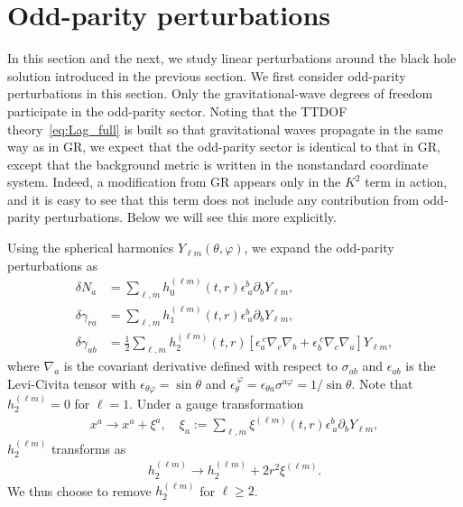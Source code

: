 \documentclass[aps,prd,preprintnumbers,superscriptaddress,nofootinbib,notitlepage]{revtex4-2}
\begin{document}
\section{Odd-parity perturbations}\label{odd-parity}


In this section and the next, we study linear perturbations around the black hole solution introduced in the previous section.
We first consider odd-parity perturbations in this section.
Only the gravitational-wave degrees of freedom participate in the odd-parity sector.
Noting that the TTDOF theory~\eqref{eq:Lag_full} is built so that gravitational waves propagate in the same way as in GR, we expect that the odd-parity sector is identical to that in GR,
except that the background metric is written in the nonstandard coordinate system.
Indeed, a modification from GR appears only in the $K^2$ term in action,
and it is easy to see that
this term does not include any contribution from odd-parity perturbations.
Below we will see this more explicitly.



Using the spherical harmonics $Y_{\ell m}(\theta,\varphi)$,
we expand the odd-parity perturbations as
\begin{align}
    \delta N_a &= \sum_{\ell,m}h_0^{(\ell m)}(t,r)
    \epsilon^b_{~a}\partial_bY_{\ell m},
    \\
    \delta \gamma_{ra} &= \sum_{\ell,m}h_1^{(\ell m)}(t,r)
    \epsilon^b_{~a}\partial_bY_{\ell m},
    \\
    \delta \gamma_{ab}&=\frac{1}{2}
    \sum_{\ell,m}h_2^{(\ell m)}(t,r)
    \left[\epsilon_a^{~c}\nabla_c\nabla_b+\epsilon_b^{~c}\nabla_c\nabla_a\right]Y_{\ell m},
\end{align}
where $\nabla_a$ is the covariant derivative defined with respect to $\sigma_{ab}$
and $\epsilon_{ab}$ is the Levi-Civita tensor with $\epsilon_{\theta\varphi}=\sin\theta$
and $\epsilon_{\theta}^{~\varphi}=\epsilon_{\theta a}\sigma^{a\varphi}=1/\sin\theta$.
Note that $h_2^{(\ell m)}=0$ for $\ell=1$.
Under a gauge transformation
\begin{align}
x^a\to x^a+\xi^a,\quad \xi_a:=\sum_{\ell,m}\xi^{(\ell m)}(t,r)
\epsilon^b_{~a}\partial_bY_{\ell m},
\end{align}
$h_2^{(\ell m)}$ transforms as
\begin{align}
h_2^{(\ell m)}\to h_2^{(\ell m)}+2r^2\xi^{(\ell m)}.
\end{align}
We thus choose to remove $h_2^{(\ell m)}$ for $\ell\ge 2$.
\end{document}

